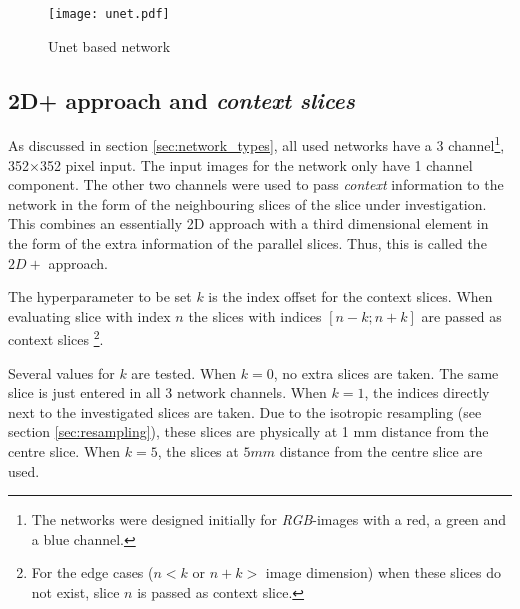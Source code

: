 \begin{figure}
    \centering
    \texttt{[image: unet.pdf]}
    \caption{Unet based network}
\end{figure}

\subsection{2D+ approach and \textit{context slices}\label{section:twoDplus}}

As discussed in section \ref{sec:network_types}, all used networks have a 3 channel\footnote{The networks were designed initially for \textit{RGB}-images with a red, a green and a blue channel.}, 
352$\times$352 pixel input. 
The input images for the network only have 1 channel component. 
The other two channels were used to pass \textit{context} information to the network in the form of the neighbouring slices of the slice under investigation.
This combines an essentially 2D approach with a third dimensional element in the form of the extra information of the parallel slices. Thus, this is called the $2D+$ approach.


The hyperparameter to be set $k$ is the index offset for the context slices.
When evaluating slice with index $n$ the slices with indices $\left[n-k; n+k\right]$ are passed as context slices
\footnote{For the edge cases ($n<k$ or $n+k>$ image dimension) when these slices do not exist, slice $n$ is passed as context slice.}.


Several values for $k$ are tested. When $k=0$, no extra slices are taken. The same slice is just entered in all 3 network channels. When $k=1$, the indices directly next to the investigated slices are taken.
Due to the isotropic resampling (see section \ref{sec:resampling}), these slices are physically at 1 mm distance from the centre slice. When $k=5$, the slices at $5 mm$ distance from the centre slice are used.

